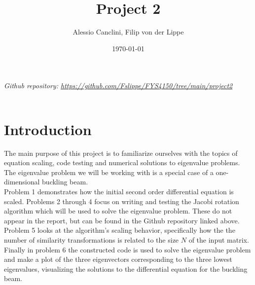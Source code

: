 \documentclass[english,notitlepage]{revtex4-1}  %
\begin{document}
\title{Project 2}
\author{Alessio Canclini, Filip von der Lippe}
\date{\today}
\noaffiliation                            %


\maketitle

\textit{Github repository: \url{https://github.com/Fslippe/FYS4150/tree/main/project2}}
\\
\\
\section*{Introduction}
The main purpose of this project is to familiarize ourselves with the topics
of equation scaling, code testing and numerical solutions to eigenvalue problems.
The eigenvalue problem we will be working with is a special case of a
one-dimensional buckling beam. \\
Problem 1 demonstrates how the initial second order differential equation
is scaled. Problems 2 through 4 focus on writing and testing the Jacobi rotation algorithm which
will be used to solve the eigenvalue problem. These do not appear in the report,
but can be found in the Github repository linked above. Problem 5 looks at the
algorithm's scaling behavior, specifically how the the number of similarity transformations
is related to the size $N$ of the input matrix. Finally in problem 6 the constructed code is used
to solve the eigenvalue problem and make a plot of the three eigenvectors corresponding to the
three lowest eigenvalues, visualizing the solutions to the differential equation for the buckling beam. \\
\\
\\
\end{document}
